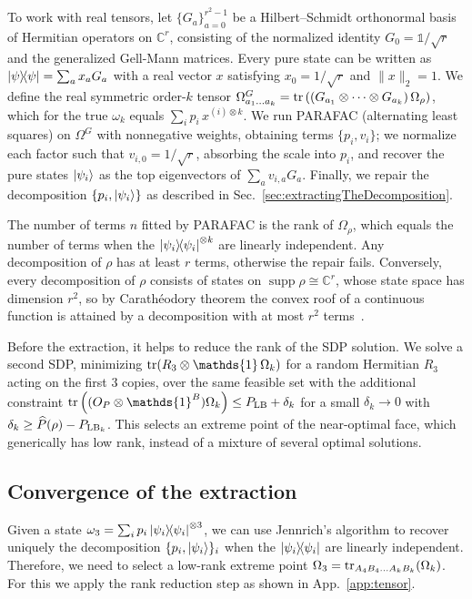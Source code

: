 \documentclass[aps,pra,twocolumn,superscriptaddress]{revtex4-2}
\newcommand{\ot}{\otimes}
\newcommand{\one}{\mathds{1}}
\newcommand{\I}{\one}
\newcommand{\C}{\mathds{C}}
\begin{document}
\begin{widetext}
To work with real tensors, let $\{G_a\}_{a=0}^{r^2-1}$ be a Hilbert--Schmidt orthonormal basis of Hermitian operators on $\C^r$, consisting of the normalized identity $G_0=\I/\sqrt r$ and the generalized Gell-Mann matrices. Every pure state can be written as $\dyad{\psi}=\sum_ax_aG_a$ with a real vector $x$ satisfying $x_0=1/\sqrt r$ and $\|x\|_2=1$. We define the real symmetric order-$k$ tensor $\Omega^G_{a_1\dots a_k}=\tr\left((G_{a_1}\otimes\dots\otimes G_{a_k})\,\Omega_\rho\right)$, which for the true $\omega_k$ equals $\sum_ip_i\,x^{(i)\otimes k}$. We run PARAFAC (alternating least squares) on $\Omega^G$ with nonnegative weights, obtaining terms $\{p_i,v_i\}$; we normalize each factor such that $v_{i,0}=1/\sqrt r$, absorbing the scale into $p_i$, and recover the pure states $\ket{\psi_i}$ as the top eigenvectors of $\sum_av_{i,a}G_a$. Finally, we repair the decomposition $\{p_i,\ket{\psi_i}\}$ as described in Sec.~\ref{sec:extractingTheDecomposition}.

The number of terms $n$ fitted by PARAFAC is the rank of $\Omega_\rho$, which equals the number of terms when the $\dyad{\psi_i}^{\otimes k}$ are linearly independent.
Any decomposition of $\rho$ has at least $r$ terms, otherwise the repair fails. Conversely, every decomposition of $\rho$ consists of states on $\operatorname{supp}\rho\cong\C^r$, whose state space has dimension $r^2$, so by Carath\'eodory theorem the convex roof of a continuous function is attained by a decomposition with at most $r^2$ terms~\cite[Lemma~A-2]{Uhlmann1998}.

Before the extraction, it helps to reduce the rank of the SDP solution. We solve a second SDP, minimizing $\tr(R_3 \ot \I \,\Omega_k)$ for a random Hermitian $R_3$ acting on the first $3$ copies, over the same feasible set with the additional constraint $\tr\left((O_P\otimes\I^B)\Omega_k\right)\leq P_{\rm LB}+\delta_k$ for a small $\delta_k\to0$ with $\delta_k \geq \widehat{P}(\rho)-P_{{\rm LB}_k}$. This selects an extreme point of the near-optimal face, which generically has low rank, instead of a mixture of several optimal solutions.

\subsection{Convergence of the extraction}\label{app:extractionConv}
Given a state $\omega_3 = \sum_i p_i \dyad{\psi_i}^{\otimes 3}$, we can use Jennrich's algorithm to recover uniquely the decomposition $\{p_i, \ket{\psi_i}\}_i$ when the $\dyad{\psi_i}$ are linearly independent. Therefore, we need to select a low-rank extreme point $\Omega_3 = \tr_{A_4B_4\dots A_kB_k}(\Omega_k)$. For this we apply the rank reduction step as shown in App.~\ref{app:tensor}.


\end{widetext}
\end{document}
